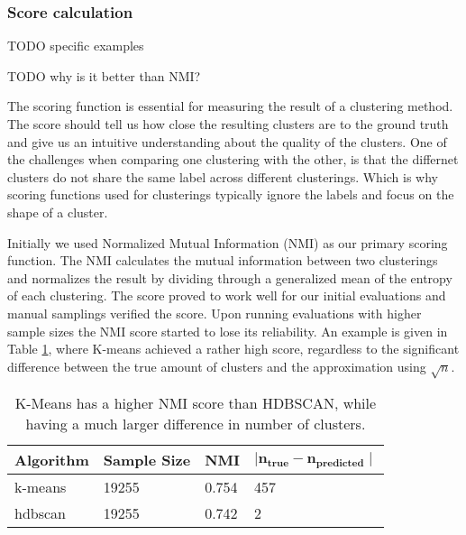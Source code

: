 
\subsubsection{Score calculation}

TODO specific examples

TODO why is it better than NMI?

The scoring function is essential for measuring the result of a clustering method. The score should tell us how close the resulting clusters are to the ground truth and give us an intuitive understanding about the quality of the clusters. One of the challenges when comparing one clustering with the other, is that the differnet clusters do not share the same label across different clusterings. Which is why scoring functions used for clusterings typically ignore the labels and focus on the shape of a cluster.

Initially we used Normalized Mutual Information (NMI) as our primary scoring function. The NMI calculates the mutual information between two clusterings and normalizes the result by dividing through a generalized mean of the entropy of each clustering. %
The score proved to work well for our initial evaluations and manual samplings verified the score. Upon running evaluations with higher sample sizes the NMI score started to lose its reliability. An example is given in Table \ref{tab:nmi_kmeans_example}, where K-means achieved a rather high score, regardless to the significant difference between the true amount of clusters and the approximation using $\sqrt{n}$.


\begin{table}[h]
    \centering
    \begin{tabular}{|l|l|l|l|}
    \hline
    \textbf{Algorithm} & \textbf{Sample Size} & \textbf{NMI}  & $\mathbf{ \mid n_{true} - n_{predicted} \mid }$ \\ \hline
    k-means & 19255 & 0.754 & 457 \\ \hline
    hdbscan & 19255 & 0.742 & 2 \\ \hline
    \end{tabular}
    \caption{K-Means has a higher NMI score than HDBSCAN, while having a much larger difference in number of clusters.}
    \label{tab:nmi_kmeans_example}
\end{table}


